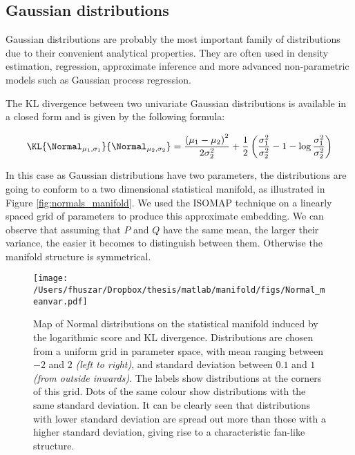 
\subsection{Gaussian distributions}

Gaussian distributions are probably the most important family of distributions due to their convenient analytical properties. They are often used in density estimation, regression, approximate inference and more advanced non-parametric models such as Gaussian process regression.

The KL divergence between two univariate Gaussian distributions is available in a closed form and is given by the following formula:

\begin{equation}
	\KL{\Normal_{\mu_1,\sigma_1}}{\Normal_{\mu_2,\sigma_2}} = \frac{\left(\mu_1 - \mu_2\right)^2}{2\sigma_2^2} + \frac{1}{2}\left(\frac{\sigma_1^2}{\sigma_2^2} - 1 - \log\frac{\sigma_1^2}{\sigma_2^2}\right)
\end{equation}

In this case as Gaussian distributions have two parameters, the distributions are going to conform to a two dimensional statistical manifold, as illustrated in Figure \ref{fig:normals_manifold}. We used the ISOMAP technique on a linearly spaced grid of parameters to produce this approximate embedding. We can observe that assuming that $P$ and $Q$ have the same mean, the larger their variance, the easier it becomes to distinguish between them. Otherwise the manifold structure is symmetrical.

\begin{figure} %
	\begin{center}
	\texttt{[image: /Users/fhuszar/Dropbox/thesis/matlab/manifold/figs/Normal\_meanvar.pdf]}
	\end{center}
	\caption[Map of Normal distributions by the KL divergence]{Map of Normal distributions on the statistical manifold induced by the logarithmic score and KL divergence. Distributions are chosen from a uniform grid in parameter space, with mean ranging between $-2$ and $2$ \emph{(left to right)}, and standard deviation between $0.1$ and $1$ \emph{(from outside inwards)}. The labels show distributions at the corners of this grid.  Dots of the same colour show distributions with the same standard deviation. It can be clearly seen that distributions with lower standard deviation are spread out more than those with a higher standard deviation, giving rise to a characteristic fan-like structure.}
	\label{fig:Normal_meanvar}
\end{figure}

